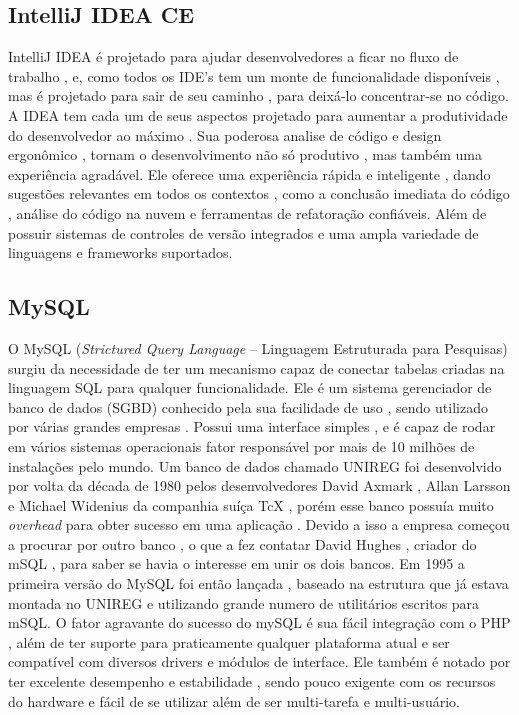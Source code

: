 \documentclass[12pt]{article}
\begin{document}
\subsection{IntelliJ IDEA CE}
	IntelliJ IDEA é projetado para ajudar desenvolvedores a ficar no fluxo de trabalho , e, como todos os IDE’s tem um monte de funcionalidade disponíveis , mas é projetado para sair de seu caminho , para deixá-lo concentrar-se no código.  A IDEA tem cada um de seus aspectos projetado para aumentar a produtividade do desenvolvedor ao máximo .
	Sua poderosa analise de código e design  ergonômico  , tornam o desenvolvimento não só produtivo , mas também uma experiência agradável. Ele oferece uma experiência rápida e inteligente , dando sugestões relevantes em todos os contextos , como a conclusão imediata do código , análise do código na nuvem e ferramentas de refatoração confiáveis. Além de possuir sistemas de controles de versão integrados e uma ampla variedade de linguagens e frameworks suportados.
\subsection{MySQL}
	O MySQL (\textit{Strictured Query Language} – Linguagem Estruturada para Pesquisas) surgiu da necessidade de ter um mecanismo capaz de conectar tabelas criadas na linguagem SQL para qualquer funcionalidade. Ele é um sistema gerenciador de banco de dados (SGBD) conhecido pela sua facilidade de uso , sendo utilizado por várias grandes empresas . Possui uma interface simples , e é capaz de rodar em vários sistemas operacionais  fator responsável por mais de 10 milhões de instalações pelo mundo.
	Um banco de dados chamado UNIREG foi desenvolvido  por volta da década de 1980 pelos desenvolvedores David Axmark , Allan Larsson e Michael Widenius da companhia suíça TcX , porém esse banco possuía muito \textit{overhead} para obter sucesso em uma aplicação . Devido a isso a empresa começou a procurar por outro banco , o que a fez contatar David Hughes , criador do mSQL , para saber se havia o interesse em unir os dois bancos. 
	Em 1995 a primeira versão do MySQL foi então lançada , baseado na estrutura que já estava montada no UNIREG e utilizando grande numero de utilitários escritos para mSQL.
	O fator agravante do sucesso do mySQL é sua fácil integração com o PHP , além de ter suporte para praticamente qualquer plataforma atual e ser compatível com diversos drivers e módulos de interface. Ele também é notado por ter excelente desempenho e estabilidade , sendo pouco exigente com os recursos do hardware e fácil de se utilizar além de ser  multi-tarefa e multi-usuário.
\end{document}
